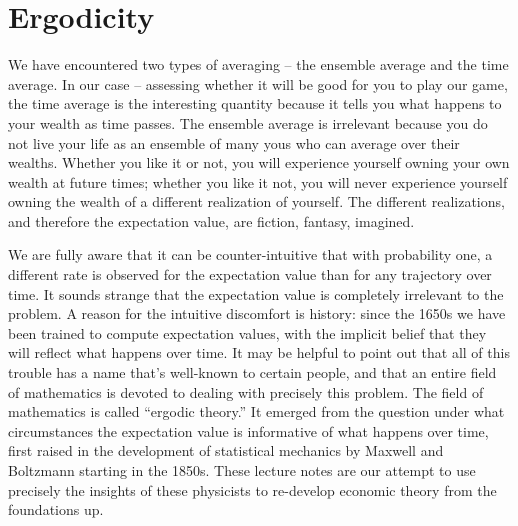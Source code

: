 \section{Ergodicity}

We have encountered two types of averaging -- the ensemble average and the
time average. In our case -- assessing whether it will be good for you to play our 
game, the time average is the interesting quantity because it tells you what happens
to your wealth as time passes. The ensemble average is irrelevant 
because you do not live your life as an ensemble of many yous who can average
over their wealths. Whether you like it or not, you will experience yourself owning 
your own wealth at future times; whether you like it not, you will never experience
yourself owning the wealth of a different realization of yourself. The different realizations,
and therefore the expectation value, are fiction, fantasy, imagined.

We are fully aware that it can be counter-intuitive that with probability one, a different
rate is observed for the expectation value than for any trajectory over time. It sounds
strange that the expectation value is completely irrelevant to the problem. A reason
for the intuitive discomfort is history: since the 1650s we have been trained to
compute expectation values, with the implicit belief that they will reflect what happens
over time. It may be helpful to point out that all of this trouble has a name that's well-known
to certain people, and that an entire field of mathematics is devoted to dealing with
precisely this problem. The field of mathematics is called ``ergodic theory.'' It emerged
from the question under what circumstances the expectation value is informative 
of what happens over time, first raised in the development of statistical mechanics by Maxwell and 
Boltzmann starting in the 1850s. These lecture notes are our attempt to use precisely the insights of these physicists to re-develop economic theory from the foundations up.

